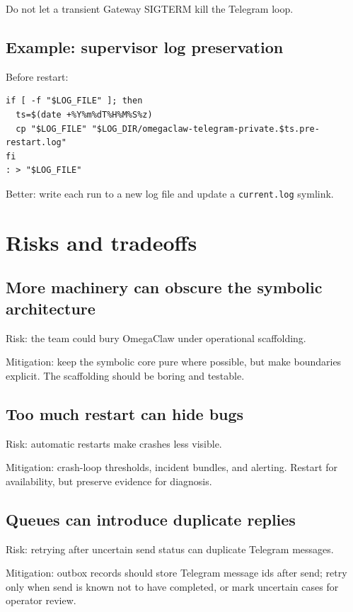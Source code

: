 \documentclass[11pt]{article}
\begin{document}
Do not let a transient Gateway SIGTERM kill the Telegram loop.

\subsection{Example: supervisor log preservation}

Before restart:

\begin{Verbatim}[fontsize=\small]
if [ -f "$LOG_FILE" ]; then
  ts=$(date +%Y%m%dT%H%M%S%z)
  cp "$LOG_FILE" "$LOG_DIR/omegaclaw-telegram-private.$ts.pre-restart.log"
fi
: > "$LOG_FILE"
\end{Verbatim}

Better: write each run to a new log file and update a \texttt{current.log} symlink.

\section{Risks and tradeoffs}

\subsection{More machinery can obscure the symbolic architecture}

Risk: the team could bury OmegaClaw under operational scaffolding.

Mitigation: keep the symbolic core pure where possible, but make boundaries explicit. The scaffolding should be boring and testable.

\subsection{Too much restart can hide bugs}

Risk: automatic restarts make crashes less visible.

Mitigation: crash-loop thresholds, incident bundles, and alerting. Restart for availability, but preserve evidence for diagnosis.

\subsection{Queues can introduce duplicate replies}

Risk: retrying after uncertain send status can duplicate Telegram messages.

Mitigation: outbox records should store Telegram message ids after send; retry only when send is known not to have completed, or mark uncertain cases for operator review.
\end{document}
